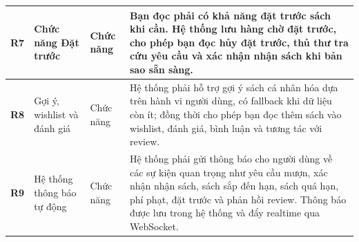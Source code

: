 \begin{longtable}{|p{}|p{}|p{}|p{}|}
\hline
\textbf{R7} & Chức năng Đặt trước & Chức năng & Bạn đọc phải có khả năng \textbf{đặt trước} sách khi cần. Hệ thống lưu hàng chờ đặt trước, cho phép bạn đọc hủy đặt trước, thủ thư tra cứu yêu cầu và xác nhận nhận sách khi bản sao sẵn sàng. \\
\hline
\textbf{R8} & Gợi ý, wishlist và đánh giá & Chức năng & Hệ thống phải hỗ trợ gợi ý sách cá nhân hóa dựa trên hành vi người dùng, có fallback khi dữ liệu còn ít; đồng thời cho phép bạn đọc thêm sách vào wishlist, đánh giá, bình luận và tương tác với review. \\
\hline
\textbf{R9} & Hệ thống thông báo tự động & Chức năng & Hệ thống phải gửi thông báo cho người dùng về các sự kiện quan trọng như yêu cầu mượn, xác nhận nhận sách, sách sắp đến hạn, sách quá hạn, phí phạt, đặt trước và phản hồi review. Thông báo được lưu trong hệ thống và đẩy realtime qua WebSocket. \\
\hline
\end{longtable}

